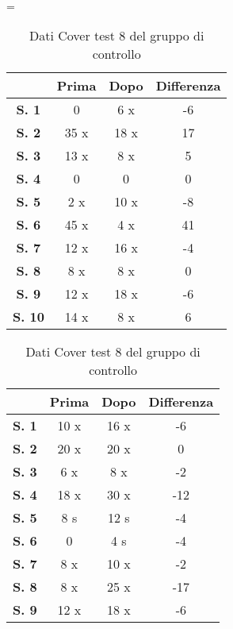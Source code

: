 \\\ \\\ \\\ \\\ \\\ \\\ \\\ 
\begin{table}[H]
\centering
\setlength\tabcolsep{4pt}
\begin{minipage}{0.48\textwidth}
\centering
\tablewidth=\textwidth

\begin{tabular}{|c|c|c|c|} \hline
{\textbf{}} & {\textbf{Prima}} & {\textbf{Dopo}}& {\textbf{Differenza}} \\ \hline
\textbf{S. 1} & 0 & 6 x & -6 \\ \hline
\textbf{S. 2} & 35 x & 18 x & 17 \\ \hline
\textbf{S. 3} & 13 x & 8 x & 5 \\ \hline
\textbf{S. 4} & 0 & 0 & 0 \\ \hline
\textbf{S. 5} & 2 x & 10 x & -8 \\ \hline
\textbf{S. 6} & 45 x & 4 x & 41 \\ \hline
\textbf{S. 7} & 12 x & 16 x & -4 \\ \hline
\textbf{S. 8} & 8 x & 8 x & 0 \\ \hline
\textbf{S. 9} & 12 x & 18 x & -6 \\ \hline
\textbf{S. 10} & 14 x & 8 x & 6 \\ \hline
\end{tabular} 
\caption{Dati Cover test 8 del gruppo sperimentale}

\label{tab:accuracy} 
\end{minipage}%
\hfill
\begin{minipage}{0.48\textwidth}
\centering

\begin{tabular}{|c|c|c|c|} \hline
{\textbf{}} & {\textbf{Prima}} & {\textbf{Dopo}}& {\textbf{Differenza}} \\ \hline
\textbf{S. 1} & 10 x & 16 x & -6 \\ \hline
\textbf{S. 2} & 20 x & 20 x & 0 \\ \hline
\textbf{S. 3} & 6 x & 8 x & -2 \\ \hline
\textbf{S. 4} & 18 x & 30 x & -12 \\ \hline
\textbf{S. 5} & 8 s & 12 s & -4 \\ \hline
\textbf{S. 6} & 0  & 4 s & -4 \\ \hline
\textbf{S. 7} & 8 x & 10 x & -2 \\ \hline
\textbf{S. 8} & 8 x & 25 x & -17 \\ \hline
\textbf{S. 9} & 12 x & 18 x & -6 \\ \hline
\end{tabular} 
\caption{Dati Cover test 8 del gruppo di controllo}

 \label{tab:ompdiff} 
\end{minipage}
\end{table}
